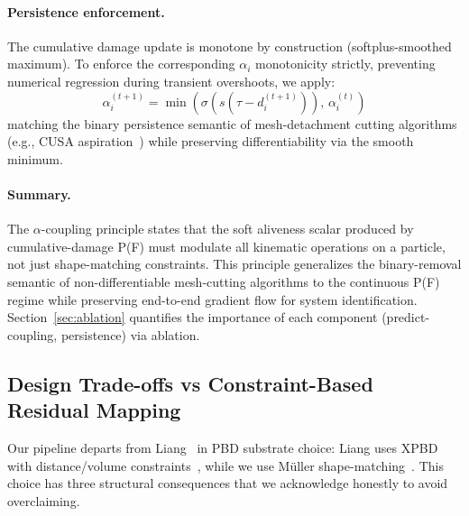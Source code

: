\paragraph{Persistence enforcement.}
The cumulative damage update is monotone by construction (softplus-smoothed
maximum). To enforce the corresponding $\alpha_i$ monotonicity strictly,
preventing numerical regression during transient overshoots, we apply:
\begin{equation}
\alpha_i^{(t+1)} = \min\!\left(\sigma(s(\tau - d_i^{(t+1)})), \, \alpha_i^{(t)}\right)
\label{eq:alpha_persistence}
\end{equation}
matching the binary persistence semantic of mesh-detachment cutting
algorithms (e.g., CUSA aspiration~\cite{cppsim}) while preserving
differentiability via the smooth minimum.

\paragraph{Summary.}
The $\alpha$-coupling principle states that the soft aliveness scalar
produced by cumulative-damage P(F) must modulate all kinematic operations
on a particle, not just shape-matching constraints. This principle
generalizes the binary-removal semantic of non-differentiable mesh-cutting
algorithms to the continuous P(F) regime while preserving end-to-end
gradient flow for system identification. Section~\ref{sec:ablation}
quantifies the importance of each component (predict-coupling, persistence)
via ablation.


\subsection{Design Trade-offs vs Constraint-Based Residual Mapping}
\label{sec:design_tradeoff}

Our pipeline departs from Liang~\cite{liang2023} in PBD substrate choice:
Liang uses XPBD with distance/volume constraints~\cite{macklin2016}, while
we use M\"uller shape-matching~\cite{muller2005}. This choice has three
structural consequences that we acknowledge honestly to avoid overclaiming.

